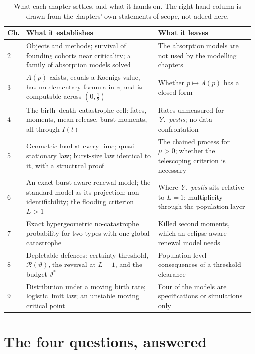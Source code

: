 \documentclass[11pt,a4paper]{report}
\newcommand{\yp}{\textit{Y.~pestis}}
\theoremstyle{plain}
\theoremstyle{remark}
\begin{document}
\begin{table}[!htbp]
\centering
\footnotesize
\renewcommand{\arraystretch}{1.15}
\begin{tabular}{@{}l>{\raggedright\arraybackslash}p{}>{\raggedright\arraybackslash}p{}@{}}
\toprule
Ch. & What it establishes & What it leaves \\
\midrule
2 & Objects and methods; survival of founding cohorts near criticality;
    a family of absorption models solved
  & The absorption models are not used by the modelling chapters \\
3 & $A(p)$ exists, equals a Koenigs value, has no elementary formula in $z$,
    and is computable across $(0,\tfrac12)$
  & Whether $p\mapsto A(p)$ has a closed form \\
4 & The birth--death--catastrophe cell: fates, moments, mean release, burst
    moments, all through $I(t)$
  & Rates unmeasured for \yp{}; no data confrontation \\
5 & Geometric load at every time; quasi-stationary law; burst-size law
    identical to it, with a structural proof
  & The chained process for $\mu>0$; whether the telescoping criterion is
    necessary \\
6 & An exact burst-aware renewal model; the standard model as its
    projection; non-identifiability; the flooding criterion $L>1$
  & Where \yp{} sits relative to $L=1$; multiplicity through the population
    layer \\
7 & Exact hypergeometric no-catastrophe probability for two types with one
    global catastrophe
  & Killed second moments, which an eclipse-aware renewal model needs \\
8 & Depletable defences: certainty threshold, $\mathcal{R}(\vartheta)$, the
    reversal at $L=1$, and the budget $\vartheta^{\ast}$
  & Population-level consequences of a threshold clearance \\
9 & Distribution under a moving birth rate; logistic limit law; an unstable
    moving critical point
  & Four of the models are specifications or simulations only \\
\bottomrule
\end{tabular}
\caption{What each chapter settles, and what it hands on. The right-hand
column is drawn from the chapters' own statements of scope, not added here.}
\label{con:tab:contributions}
\end{table}

\FloatBarrier

\section{The four questions, answered}
\label{con:sec:questions}
\end{document}
